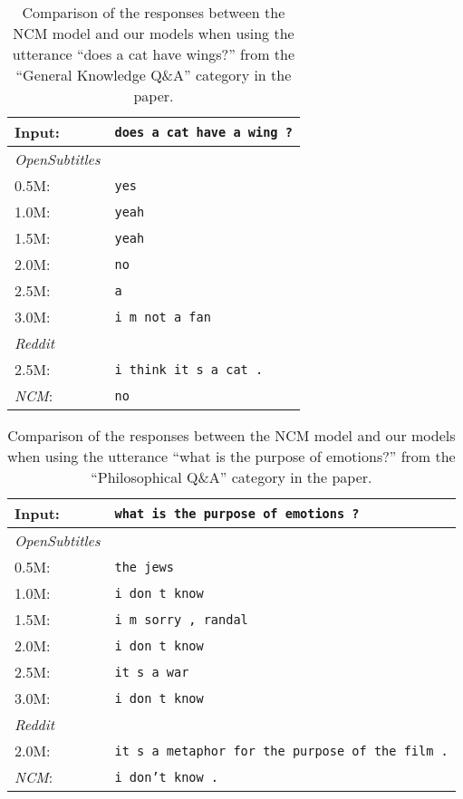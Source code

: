 \begin{table}[H]
	\centering
	\begin{adjustbox}{max width=\textwidth}
		\begin{tabularx}{\textwidth}{lX}
			\toprule
			Input: 	& \texttt{does a cat have a wing ?}\\
			\midrule
			\emph{OpenSubtitles}\\
			0.5M: 	& \texttt{yes}\\
			1.0M: 	& \texttt{yeah}\\
			1.5M:	& \texttt{yeah}\\
			2.0M:	& \texttt{no}\\
			2.5M:	& \texttt{a}\\
			3.0M:	& \texttt{i m not a fan}\\
			\midrule
			\emph{Reddit}\\
			2.5M:	& \texttt{i think it s a cat .}\\
			\midrule
			\emph{NCM}:	& \texttt{no}\\
			\bottomrule
		\end{tabularx}
	\end{adjustbox}
	\caption{Comparison of the responses between the NCM model and our models when using the utterance ``does a cat have wings?'' from the ``General Knowledge Q\&A'' category in the paper.}
	\label{results:example17_output:Neural_Conversational_Model_compared}
\end{table}


\begin{table}[H]
	\centering
	\begin{adjustbox}{max width=\textwidth}
		\begin{tabularx}{\textwidth}{lX}
			\toprule
			Input: 	& \texttt{what is the purpose of emotions ?}\\
			\midrule
			\emph{OpenSubtitles}\\
			0.5M: 	& \texttt{the jews}\\
			1.0M: 	& \texttt{i don t know}\\
			1.5M:	& \texttt{i m sorry , randal}\\
			2.0M:	& \texttt{i don t know}\\
			2.5M:	& \texttt{it s a war}\\
			3.0M:	& \texttt{i don t know}\\
			\midrule
			\emph{Reddit}\\
			2.0M:	& \texttt{it s a metaphor for the purpose of the film .}\\
			\midrule
			\emph{NCM}:	& \texttt{i don't know .}\\
			\bottomrule
		\end{tabularx}
	\end{adjustbox}
	\caption{Comparison of the responses between the NCM model and our models when using the utterance ``what is the purpose of emotions?'' from the ``Philosophical Q\&A'' category in the paper.}
	\label{results:example17_output:Neural_Conversational_Model_compared}
\end{table}

